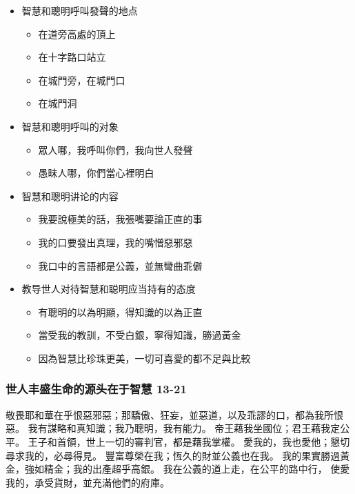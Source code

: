 \begin{itemize}
\itemsep-.45em  
\item 智慧和聰明呼叫發聲的地点
\begin{itemize}
\itemsep-.45em  
\item 在道旁高處的頂上
\item 在十字路口站立
\item 在城門旁，在城門口
\item 在城門洞
\end{itemize}
\item 智慧和聰明呼叫的对象
\begin{itemize}
\itemsep-.45em  
\item 眾人哪，我呼叫你們，我向世人發聲
\item 愚昧人哪，你們當心裡明白
\end{itemize}
\item 智慧和聰明讲论的内容
\begin{itemize}
\itemsep-.45em  
\item 我要說極美的話，我張嘴要論正直的事
\item 我的口要發出真理，我的嘴憎惡邪惡
\item 我口中的言語都是公義，並無彎曲乖僻
\end{itemize}
\item 教导世人对待智慧和聪明应当持有的态度
\begin{itemize}
\itemsep-.45em  
\item 有聰明的以為明顯，得知識的以為正直
\item 當受我的教訓，不受白銀，寧得知識，勝過黃金
\item 因為智慧比珍珠更美，一切可喜愛的都不足與比較
\end{itemize}
\end{itemize}

\subsubsection{世人丰盛生命的源头在于智慧 13-21}
敬畏耶和華在乎恨惡邪惡；那驕傲、狂妄，並惡道，以及乖謬的口，都為我所恨惡。
我有謀略和真知識；我乃聰明，我有能力。
帝王藉我坐國位；君王藉我定公平。
王子和首領，世上一切的審判官，都是藉我掌權。
愛我的，我也愛他；懇切尋求我的，必尋得見。
豐富尊榮在我；恆久的財並公義也在我。
我的果實勝過黃金，強如精金；我的出產超乎高銀。
我在公義的道上走，在公平的路中行，
使愛我的，承受貨財，並充滿他們的府庫。

